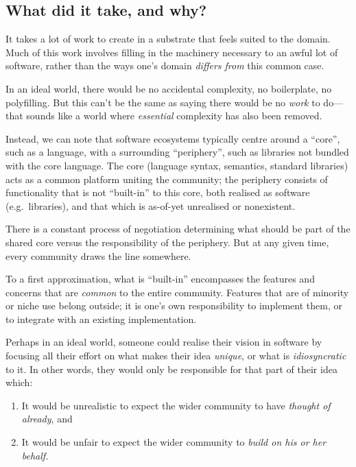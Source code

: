 \hypertarget{what-did-it-take-and-why}{%
\subsection{What did it take, and why?}\label{what-did-it-take-and-why}}

It takes a lot of work to create in a substrate that feels suited to the
domain. Much of this work involves filling in the machinery necessary to
an awful lot of software, rather than the ways one's domain
\emph{differs from} this common case.

In an ideal world, there would be no accidental complexity, no
boilerplate, no polyfilling. But this can't be the same as saying there
would be no \emph{work} to do---that sounds like a world where
\emph{essential} complexity has also been removed.

Instead, we can note that software ecosystems typically centre around a
``core'', such as a language, with a surrounding ``periphery'', such as
libraries not bundled with the core language. The core (language syntax,
semantics, standard libraries) acts as a common platform uniting the
community; the periphery consists of functionality that is not
``built-in'' to this core, both realised as software (e.g.~libraries),
and that which is as-of-yet unrealised or nonexistent.

There is a constant process of negotiation determining what should be
part of the shared core versus the responsibility of the periphery. But
at any given time, every community draws the line somewhere.

To a first approximation, what is ``built-in'' encompasses the features
and concerns that are \emph{common} to the entire community. Features
that are of minority or niche use belong outside; it is one's own
responsibility to implement them, or to integrate with an existing
implementation.

Perhaps in an ideal world, someone could realise their vision in
software by focusing all their effort on what makes their idea
\emph{unique}, or what is \emph{idiosyncratic} to it. In other words,
they would only be responsible for that part of their idea which:

\begin{enumerate}
\def\labelenumi{\arabic{enumi}.}
\tightlist
\item
  It would be unrealistic to expect the wider community to have
  \emph{thought of already}, and
\item
  It would be unfair to expect the wider community to \emph{build on his
  or her behalf.}
\end{enumerate}

